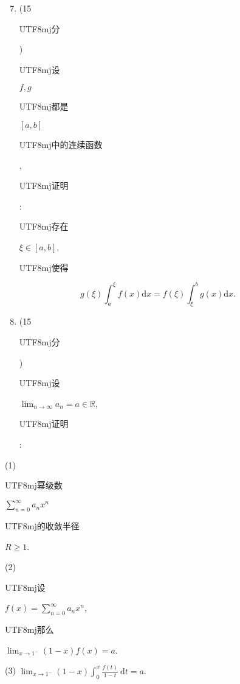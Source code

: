 \documentclass[10pt]{article}
\begin{document}
\begin{enumerate}
  \setcounter{enumi}{6}
  \item (15 \begin{CJK}{UTF8}{mj}分\end{CJK}) \begin{CJK}{UTF8}{mj}设\end{CJK} $f, g$ \begin{CJK}{UTF8}{mj}都是\end{CJK} $[a, b]$ \begin{CJK}{UTF8}{mj}中的连续函数\end{CJK}, \begin{CJK}{UTF8}{mj}证明\end{CJK}: \begin{CJK}{UTF8}{mj}存在\end{CJK} $\xi \in[a, b]$, \begin{CJK}{UTF8}{mj}使得\end{CJK}
\end{enumerate}
$$
g(\xi) \int_{a}^{\xi} f(x) \mathrm{d} x=f(\xi) \int_{\xi}^{b} g(x) \mathrm{d} x .
$$

\begin{enumerate}
  \setcounter{enumi}{7}
  \item (15 \begin{CJK}{UTF8}{mj}分\end{CJK}) \begin{CJK}{UTF8}{mj}设\end{CJK} $\lim _{n \rightarrow \infty} a_{n}=a \in \mathbb{R}$, \begin{CJK}{UTF8}{mj}证明\end{CJK}:
\end{enumerate}
(1) \begin{CJK}{UTF8}{mj}幂级数\end{CJK} $\sum_{n=0}^{\infty} a_{n} x^{n}$ \begin{CJK}{UTF8}{mj}的收敛半径\end{CJK} $R \geqslant 1$.

(2) \begin{CJK}{UTF8}{mj}设\end{CJK} $f(x)=\sum_{n=0}^{\infty} a_{n} x^{n}$, \begin{CJK}{UTF8}{mj}那么\end{CJK} $\lim _{x \rightarrow 1^{-}}(1-x) f(x)=a$.

(3) $\lim _{x \rightarrow 1^{-}}(1-x) \int_{0}^{x} \frac{f(t)}{1-t} \mathrm{~d} t=a$.
\end{document}
